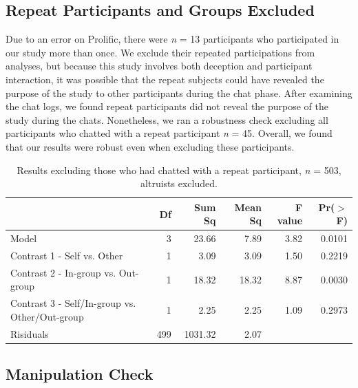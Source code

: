 \documentclass[12pt,]{article}
\begin{document}

\newpage
\subsection{Repeat Participants and Groups Excluded}
\label{appendix:exclude}

Due to an error on Prolific, there were \emph{n} = 13 participants who participated in our study more than once. We exclude their repeated participations from analyses, but because this study involves both deception and participant interaction, it was possible that the repeat subjects could have revealed the purpose of the study to other participants during the chat phase. After examining the chat logs, we found repeat participants did not reveal the purpose of the study during the chats. Nonetheless, we ran a robustness check excluding all participants who chatted with a repeat participant \emph{n} = 45. Overall, we found that our results were robust even when excluding these participants.  

\vspace{0.6cm}

\begin{table}[ht]
\centering
\begin{tabular}{lrrrrr}
  \hline
 & Df & Sum Sq & Mean Sq & F value & Pr($>$F) \\ 
  \hline
Model & 3 & 23.66 & 7.89 & 3.82 & 0.0101 \\ 
  Contrast 1 - Self vs. Other & 1 & 3.09 & 3.09 & 1.50 & 0.2219 \\ 
  Contrast 2 - In-group vs. Out-group & 1 & 18.32 & 18.32 & 8.87 & 0.0030 \\ 
  Contrast 3 - Self/In-group vs. Other/Out-group & 1 & 2.25 & 2.25 & 1.09 & 0.2973 \\ 
  Risiduals & 499 & 1031.32 & 2.07 &  &  \\ 
   \hline
\end{tabular}
\caption{Results excluding those who had chatted with a repeat participant, \emph{n} = 503, altruists excluded.} 
\label{repeats}
\end{table}


\newpage
\subsection{Manipulation Check}
\label{appendix:manip2}
\end{document}

